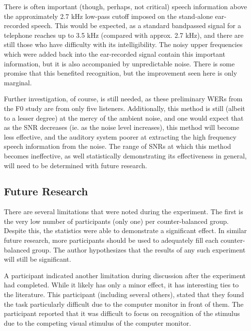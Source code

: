 There is often important (though, perhaps, not critical) speech information above the approximately 2.7 kHz low-pass cutoff imposed on the stand-alone ear-recorded speech.  This would be expected, as a standard bandpassed signal for a telephone reaches up to 3.5 kHz (compared with approx. 2.7 kHz), and there are still those who have difficulty with its intelligibility.  The noisy upper frequencies which were added back into the ear-recorded signal contain this important information, but it is also accompanied by unpredictable noise.  There is some promise that this benefited recognition, but the improvement seen here is only marginal.

Further investigation, of course, is still needed, as these preliminary WERs from the F0 study are from only five listeners.  Additionally, this method is still (albeit to a lesser degree) at the mercy of the ambient noise, and one would expect that as the SNR decreases (ie. as the noise level increases), this method will become less effective, and the auditory system poorer at extracting the high frequency speech information from the noise.  The range of SNRs at which this method becomes ineffective, as well statistically demonstrating its effectiveness in general, will need to be determined with future research.

\subsection{Future Research}\label{chap3:future-research}

There are several limitations that were noted during the experiment.  The first is the very low number of participants (only one) per counter-balanced group.  Despite this, the statistics were able to demonstrate a significant effect.  In similar future research, more participants should be used to adequately fill each counter-balanced group.  The author hypothesizes that the results of any such experiment will still be significant.  

A participant indicated another limitation during discussion after the experiment had completed.  While it likely has only a minor effect, it has interesting ties to the literature.  This participant (including several others), stated that they found the task particularly difficult due to the computer monitor in front of them.  The participant reported that it was difficult to focus on recognition of the stimulus due to the competing visual stimulus of the computer monitor.

